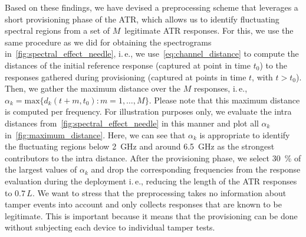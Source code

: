 \documentclass[conference]{IEEEtran}
\makeatletter
\newcommand{\ie}{i.\@\,e.\@\xspace}
\makeatother
\begin{document}
Based on these findings, we have devised a preprocessing scheme that leverages a short provisioning phase of the ATR, which  allows us to identify fluctuating spectral regions from a set of $M$~legitimate ATR responses. For this, we use the same procedure as we did for obtaining the spectrograms in~\autoref{fig:spectral_effect_needle}, \ie, we use~\autoref{eq:channel_distance} to compute the distances of the initial reference response (captured at point in time $t_0$) to the responses gathered during provisioning (captured at points in time $t$, with $t>t_0$). Then, we gather the maximum distance over the $M$ responses, \ie, $\alpha_k = \textrm{max}\{d_k(t + m, t_0) : m = 1,\ldots,M\}$. Please note that this maximum distance is computed per frequency. For illustration purposes only, we evaluate the intra distances from~\autoref{fig:spectral_effect_needle} in this manner and plot all $\alpha_k$ in~\autoref{fig:maximum_distance}. Here, we can see that $\alpha_k$ is appropriate to identify the fluctuating regions below \SI{2}{\GHz} and around \SI{6.5}{\GHz} as the strongest contributors to the intra distance. 
After the provisioning phase, we select \SI{30}{\percent} of the largest values of $\alpha_k$ and drop the corresponding frequencies from the response evaluation during the deployment \ie, reducing the length of the ATR responses to $0.7 \, L$. We want to stress that the preprocessing takes no information about tamper events into account and only collects responses that are known to be legitimate. This is important because it means that the provisioning can be done without subjecting each device to individual tamper tests.
\end{document}
